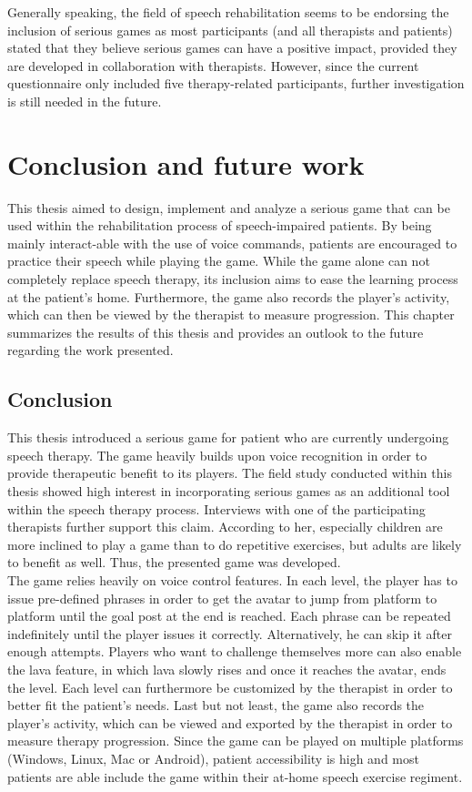 \documentclass[draft,final]{vutinfth} %
\begin{document}
Generally speaking, the field of speech rehabilitation seems to be endorsing the inclusion of serious games as most participants (and all therapists and patients) stated that they believe serious games can have a positive impact, provided they are developed in collaboration with therapists. However, since the current questionnaire only included five therapy-related participants, further investigation is still needed in the future.
\chapter{Conclusion and future work}
\label{chap:conclusion}
This thesis aimed to design, implement and analyze a serious game that can be used within the rehabilitation process of speech-impaired patients. By being mainly interact-able with the use of voice commands, patients are encouraged to practice their speech while playing the game. While the game alone can not completely replace speech therapy, its inclusion aims to ease the learning process at the patient's home. Furthermore, the game also records the player's activity, which can then be viewed by the therapist to measure progression. This chapter summarizes the results of this thesis and provides an outlook to the future regarding the work presented.

\section{Conclusion}
This thesis introduced a serious game for patient who are currently undergoing speech therapy. The game heavily builds upon voice recognition in order to provide therapeutic benefit to its players. The field study conducted within this thesis showed high interest in incorporating serious games as an additional tool within the speech therapy process. Interviews with one of the participating therapists further support this claim. According to her, especially children are more inclined to play a game than to do repetitive exercises, but adults are likely to benefit as well. Thus, the presented game was developed.\\

The game relies heavily on voice control features. In each level, the player has to issue pre-defined phrases in order to get the avatar to jump from platform to platform until the goal post at the end is reached. Each phrase can be repeated indefinitely until the player issues it correctly. Alternatively, he can skip it after enough attempts. Players who want to challenge themselves more can also enable the lava feature, in which lava slowly rises and once it reaches the avatar, ends the level. Each level can furthermore be customized by the therapist in order to better fit the patient's needs. Last but not least, the game also records the player's activity, which can be viewed and exported by the therapist in order to measure therapy progression. Since the game can be played on multiple platforms (Windows, Linux, Mac or Android), patient accessibility is high and most patients are able include the game within their at-home speech exercise regiment. \\
\end{document}
